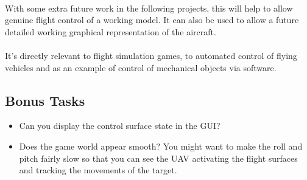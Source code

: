 \documentclass[11pt]{book}
\begin{document}
\paragraph{} With some extra future work in the following projects, this will help to allow genuine flight control of a working model. It can also be used to allow a future detailed working graphical representation of the aircraft.

\paragraph{} It's directly relevant to flight simulation games, to automated control of flying vehicles and as an example of control of mechanical objects via software.

\subsection{Bonus Tasks}

\begin{itemize}
\item Can you display the control surface state in the GUI?
\item Does the game world appear smooth? You might want to make the roll and pitch fairly slow so that you can see the UAV activating the flight surfaces and tracking the movements of the target.
\end{itemize}
\end{document}

